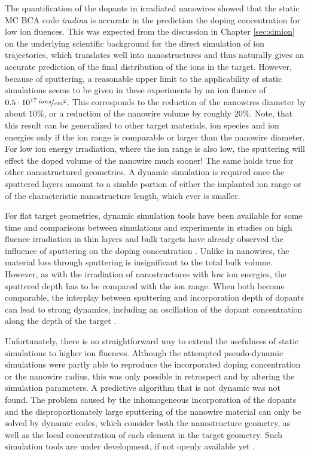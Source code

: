 \addtolength{\textheight}{1cm}
The quantification of the dopants in irradiated nanowires showed that the static MC BCA code \emph{iradina} is accurate in the prediction the doping concentration for low ion fluences. This was expected from the discussion in Chapter \ref{sec:simion} on the underlying scientific background for the direct simulation of ion trajectories, which translates well into nanostructures and thus naturally gives an accurate prediction of the final distribution of the ions in the target. However, because of sputtering, a reasonable upper limit to the applicability of static simulations seems to be given in these experiments by an ion fluence of $0.5\cdot 10^{17}\,\nicefrac{ions}{cm^2}$. This corresponds to the reduction of the nanowires diameter by about $10\%$, or a reduction of the nanowire volume by roughly $20\%$. Note, that this result can be generalized to other target materials, ion species and ion energies only if the ion range is comparable or larger than the nanowire diameter. For low ion energy irradiation, where the ion range is also low, the sputtering will effect the doped volume of the nanowire much sooner! The same holds true for other nanostructured geometries. A dynamic simulation is required once the sputtered layers amount to a sizable portion of either the implanted ion range or of the characteristic nanostructure length, which ever is smaller. 


For flat target geometries, dynamic simulation tools have been available for some time \cite{moller_tridyn_1984,moller_tridyn-binary_1988} and comparisons between simulations and experiments in studies on high fluence irradiation in thin layers and bulk targets have already observed the influence of sputtering on the doping concentration \cite{miyagawa_computer_1991,sigmund_alloy_1993}. Unlike in nanowires, the material loss through sputtering is insignificant to the total bulk volume. However, as with the irradiation of nanostructures with low ion energies, the sputtered depth has to be compared with the ion range. When both become comparable, the interplay between sputtering and incorporation depth of dopants can lead to strong dynamics, including an oscillation of the dopant concentration along the depth of the target \cite{eckstein_oscillations_2000}. 

Unfortunately, there is no straightforward way to extend the usefulness of static simulations to higher ion fluences. Although the attempted pseudo-dynamic simulations were partly able to reproduce the incorporated doping concentration or the nanowire radius, this was only possible in retrospect and by altering the simulation parameters. A predictive algorithm that is not dynamic was not found. The problem caused by the inhomogeneous incorporation of the dopants and the disproportionately large sputtering of the nanowire material can only be solved by dynamic codes, which consider both the nanostructure geometry, as well as the local concentration of each element in the target geometry. Such simulation tools are under development, if not openly available yet \cite{moller_tri3dyn_2014}.

